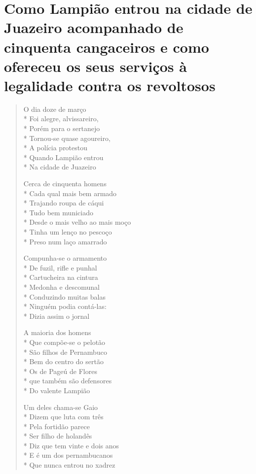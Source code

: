 
\chapter[Como Lampião entrou na cidade
de Juazeiro]{Como Lampião entrou na cidade
de Juazeiro acompanhado de
cinquenta cangaceiros e como
ofereceu os seus serviços à
legalidade contra os revoltosos}

\begin{verse}

O dia doze de março\\*
Foi alegre, alvissareiro,\\*
Porém para o sertanejo\\*
Tornou-se quase agoureiro,\\*
A polícia protestou\\*
Quando Lampião entrou\\*
Na cidade de Juazeiro

Cerca de cinquenta homens\\*
Cada qual mais bem armado\\*
Trajando roupa de cáqui\\*
Tudo bem municiado\\*
Desde o mais velho ao mais moço\\*
Tinha um lenço no pescoço\\*
Preso num laço amarrado

Compunha-se o armamento\\*
De fuzil, rifle e punhal\\*
Cartucheira na cintura\\*
Medonha e descomunal\\*
Conduzindo muitas balas\\*
Ninguém podia contá-las:\\*
Dizia assim o jornal

A maioria dos homens\\*
Que compõe-se o pelotão\\*
São filhos de Pernambuco\\*
Bem do centro do sertão\\*
Os de Pageú de Flores\\*
que também são defensores\\*
Do valente Lampião

Um deles chama-se Gaio\\*
Dizem que luta com três\\*
Pela fortidão parece\\*
Ser filho de holandês\\*
Diz que tem vinte e dois anos\\*
E é um dos pernambucanos\\*
Que nunca entrou no xadrez


\end{verse}
